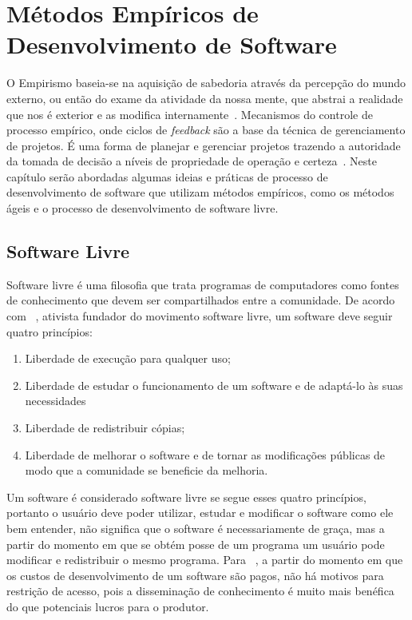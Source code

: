 \chapter{Métodos Empíricos de Desenvolvimento de Software}
\label{cap:desenvolvimento-empirico}

O Empirismo baseia-se na aquisição de sabedoria através da percepção do mundo 
externo, ou então do exame da atividade da nossa mente, que abstrai a realidade 
que nos é exterior e as modifica internamente~\cite{chaui2003}.
%
Mecanismos do controle de processo empírico, onde ciclos de \emph{feedback} são a base da técnica de gerenciamento de projetos.
%
É uma forma de planejar e gerenciar projetos trazendo a autoridade da tomada de decisão a níveis de propriedade de operação e certeza~\cite{Schwaber2004}.
%
Neste capítulo serão abordadas algumas ideias e práticas de processo de desenvolvimento
de software que utilizam métodos empíricos, como os métodos ágeis e o processo
de desenvolvimento de software livre.
%
\section{Software Livre}

Software livre é uma filosofia que trata programas de computadores como fontes de 
conhecimento que devem ser compartilhados entre a comunidade.
%
De acordo com ~, ativista fundador do movimento software livre, um software deve seguir quatro princípios:
%
\begin{enumerate}
\item Liberdade de execução para qualquer uso;
\item Liberdade de estudar o funcionamento de um software e de adaptá-lo às suas 
necessidades
\item Liberdade de redistribuir cópias;
\item Liberdade de melhorar o software e de tornar as modificações públicas de modo 
que a comunidade se beneficie da melhoria.
\end{enumerate}
%
Um software é considerado software livre se segue esses quatro princípios, portanto 
o usuário deve poder utilizar, estudar e modificar o software como ele bem entender, 
não significa que o software é necessariamente de graça, mas a partir do momento em 
que se obtém posse de um programa um usuário pode modificar e redistribuir o mesmo 
programa.
%
Para ~, a partir do momento em que os custos de desenvolvimento de um software são pagos, não há motivos para restrição de acesso, pois a disseminação de conhecimento é muito mais benéfica do que potenciais lucros para o produtor.

